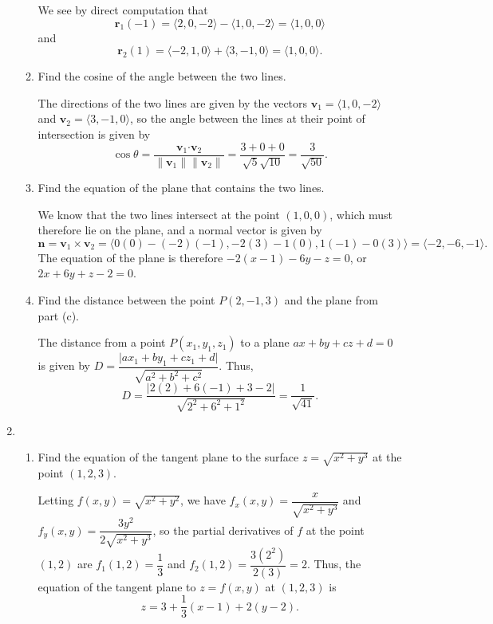 \documentclass[12pt]{article}
\newcommand{\points}[1]{\marginpar{\hspace{24pt}[#1]}}
\newcommand{\vv}{\mathbf{v}}
\newcommand{\dotp}{\boldsymbol{\cdot}}
\newcommand{\len}[1]{\lVert #1\rVert}
\begin{document}
\begin{enumerate}
\begin{enumerate}
\bigskip

We see by direct computation that 
\[
\mathbf{r}_1(-1) = \langle 2,0,-2\rangle - \langle 1,0,-2\rangle = \langle 1,0,0\rangle 
\]
 and 
\[
 \mathbf{r}_2(1) = \langle -2,1,0\rangle +\langle 3,-1,0\rangle = \langle 1,0,0\rangle.
\]

\bigskip

\item Find the cosine of the angle between the two lines. \points{3}

\bigskip

The directions of the two lines are given by the vectors $\mathbf{v}_1 = \langle 1,0,-2\rangle$ and $\mathbf{v}_2 = \langle 3,-1, 0\rangle$, so the angle between the lines at their point of intersection is given by
\[
 \cos\theta = \frac{\vv_1\dotp\vv_2}{\len{\vv_1}\len{\vv_2}} = \frac{3+0+0}{\sqrt{5}\sqrt{10}} = \frac{3}{\sqrt{50}}.
\]

\bigskip

\item Find the equation of the plane that contains the two lines. \points{4}

\bigskip

We know that the two lines intersect at the point $(1,0,0)$, which must therefore lie on the plane, and a normal vector is given by
\[
 \mathbf{n} = \vv_1\times\vv_2 = \langle 0(0)-(-2)(-1),-2(3)-1(0), 1(-1)-0(3)\rangle = \langle -2, -6, -1\rangle.
\]
The equation of the plane is therefore $-2(x-1)-6y-z=0$, or $2x+6y+z-2=0$.

\bigskip

\item Find the distance between the point $P(2,-1,3)$ and the plane from part (c).\points{3}

\bigskip

The distance from a point $P(x_1,y_1,z_1)$ to a plane $ax+by+cz+d=0$ is given by $D = \dfrac{\lvert ax_1+by_1+cz_1+d\rvert}{\sqrt{a^2+b^2+c^2}}$. Thus,
\[
 D = \frac{\lvert 2(2)+6(-1)+3-2\rvert}{\sqrt{2^2+6^2+1^2}} = \frac{1}{\sqrt{41}}.
\]


\end{enumerate}
\newpage


\item \begin{enumerate}
\item Find the equation of the tangent plane to the surface $z=\sqrt{x^2+y^3}$ at the point $(1,2,3)$. \points{5}

\bigskip

Letting $f(x,y) = \sqrt{x^2+y^2}$, we have $f_x(x,y) = \dfrac{x}{\sqrt{x^2+y^3}}$ and $f_y(x,y) = \dfrac{3y^2}{2\sqrt{x^2+y^3}}$, so the partial derivatives of $f$ at the point $(1,2)$ are $f_1(1,2) = \dfrac{1}{3}$ and $f_2(1,2) = \dfrac{3(2^2)}{2(3)} = 2$. Thus, the equation of the tangent plane to $z=f(x,y)$ at $(1,2,3)$ is
\[
 z = 3 + \frac{1}{3}(x-1)+2(y-2).
\]


\end{enumerate}
\end{enumerate}
\end{document}
